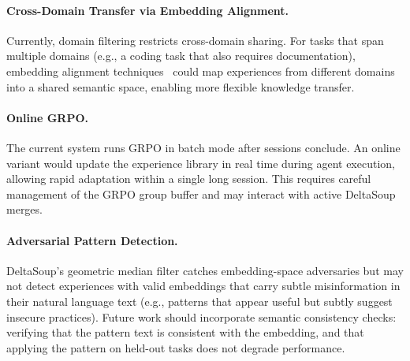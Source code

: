 \paragraph{Cross-Domain Transfer via Embedding Alignment.}
Currently, domain filtering restricts cross-domain sharing. For tasks that
span multiple domains (e.g., a coding task that also requires documentation),
embedding alignment techniques~\cite{conneau2020unsupervised} could map
experiences from different domains into a shared semantic space, enabling
more flexible knowledge transfer.

\paragraph{Online GRPO.}
The current system runs GRPO in batch mode after sessions conclude. An
online variant would update the experience library in real time during
agent execution, allowing rapid adaptation within a single long session.
This requires careful management of the GRPO group buffer and may interact
with active DeltaSoup merges.

\paragraph{Adversarial Pattern Detection.}
DeltaSoup's geometric median filter catches embedding-space adversaries
but may not detect experiences with valid embeddings that carry subtle
misinformation in their natural language text (e.g., patterns that appear
useful but subtly suggest insecure practices). Future work should incorporate
semantic consistency checks: verifying that the pattern text is consistent
with the embedding, and that applying the pattern on held-out tasks does not
degrade performance.

